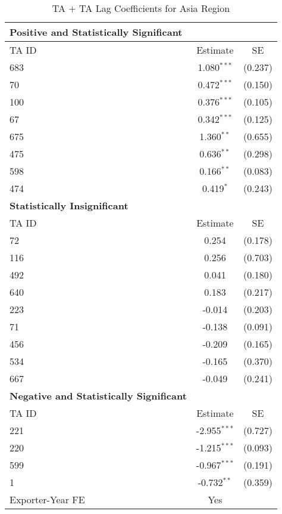 \begin{table}[htbp]
    \centering
    \caption{TA + TA Lag Coefficients for Asia Region}
    \label{tab:pta_asia}
    \begin{adjustbox}{max width=\textwidth}
    \begin{tabular}{lcc}
    \hline
    \textbf{Positive and Statistically Significant} &  &  \\
    \hline
    TA ID & Estimate & SE \\
    \hline
    683 & 1.080$^{\ast\ast\ast}$ & (0.237) \\
    70  & 0.472$^{\ast\ast\ast}$ & (0.150) \\
    100 & 0.376$^{\ast\ast\ast}$ & (0.105) \\
    67  & 0.342$^{\ast\ast\ast}$ & (0.125) \\
    675 & 1.360$^{\ast\ast}$ & (0.655) \\
    475 & 0.636$^{\ast\ast}$ & (0.298) \\
    598 & 0.166$^{\ast\ast}$ & (0.083) \\
    474 & 0.419$^{\ast}$ & (0.243) \\
    \hline
    \textbf{Statistically Insignificant} &  &  \\
    \hline
    TA ID & Estimate & SE \\
    \hline
    72  & 0.254 & (0.178) \\
    116 & 0.256 & (0.703) \\
    492 & 0.041 & (0.180) \\
    640 & 0.183 & (0.217) \\
    223 & -0.014 & (0.203) \\
    71  & -0.138 & (0.091) \\
    456 & -0.209 & (0.165) \\
    534 & -0.165 & (0.370) \\
    667 & -0.049 & (0.241) \\
    \hline
    \textbf{Negative and Statistically Significant} &  &  \\
    \hline
    TA ID & Estimate & SE \\
    \hline
    221 & -2.955$^{\ast\ast\ast}$ & (0.727) \\
    220 & -1.215$^{\ast\ast\ast}$ & (0.093) \\
    599 & -0.967$^{\ast\ast\ast}$ & (0.191) \\
    1   & -0.732$^{\ast\ast}$ & (0.359) \\
    \hline
    Exporter-Year FE & Yes \\

\end{tabular}
\end{adjustbox}
\end{table}
